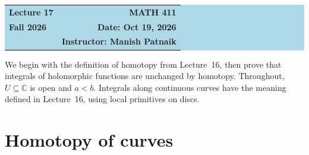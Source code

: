 \documentclass[11pt]{article}
\theoremstyle{plain}
\theoremstyle{definition}
\theoremstyle{remark}
\numberwithin{equation}{section}
\newcommand{\C}{\mathbb{C}}
\begin{document}
\begin{center}
  \colorbox{lightblue}{%
    \begin{minipage}{0.94\textwidth}
      \vspace{0.55em}
      \begin{tabular*}{\textwidth}{@{\extracolsep{\fill}}lr}
        {\color{courseblue}\bfseries\LARGE Lecture 17} &
        {\color{courseblue}\bfseries\LARGE MATH 411}\\[0.35em]
        \textbf{Fall 2026} & \textbf{Date: Oct 19, 2026}\\
        & \textbf{Instructor: Manish Patnaik}
      \end{tabular*}
      \vspace{0.45em}
    \end{minipage}}
\end{center}

\setcounter{tocdepth}{1}
\tableofcontents
\vspace{0.45em}

We begin with the definition of homotopy from Lecture~16, then prove that
integrals of holomorphic functions are unchanged by homotopy. Throughout,
$U\subseteq\C$ is open and $a<b$. Integrals along continuous curves have
the meaning defined in Lecture~16, using local primitives on discs.

\section{Homotopy of curves}
\end{document}

